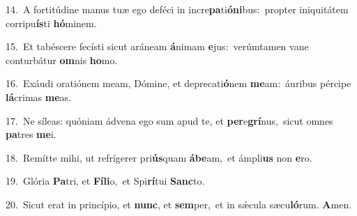 {\numbfont\textcolor{\numbcolor}{14.}}~A fortitúdine manus tuæ ego deféci in incre\-\textbf{pa}\-ti\-\textbf{ó}\-\textbf{ni}bus:~\star propter iniquitátem corripu\-\textbf{ís}\-ti \textbf{hó}\-minem.\par
{\numbfont\textcolor{\numbcolor}{15.}}~Et tabéscere fecísti sicut aráneam \textbf{á}\-nimam \textbf{e}\-jus:~\star verúmtamen vane conturbátur \textbf{om}\-nis \textbf{ho}\-mo.\par
{\numbfont\textcolor{\numbcolor}{16.}}~Exáudi oratiónem meam, Dómine, et deprecati\-\textbf{ó}\-nem \textbf{me}\-am:~\star áuribus pércipe \textbf{lá}\-crimas \textbf{me}\-as.\par
{\numbfont\textcolor{\numbcolor}{17.}}~Ne síleas: quóniam ádvena ego sum apud te, et \textbf{per}\-e\-\textbf{grí}\-nus,~\star sicut omnes \textbf{pa}\-tres \textbf{me}\-i.\par
{\numbfont\textcolor{\numbcolor}{18.}}~Remítte mihi, ut refrígerer pri\-\textbf{ús}\-quam \textbf{á}\-\textbf{be}am,~\star et ámpli\textbf{us} non \textbf{e}\-ro.\par
{\numbfont\textcolor{\numbcolor}{19.}}~Glória \textbf{Pa}\-tri, et \textbf{Fí}\-\textbf{li}o,~\star et Spi\-\textbf{rí}\-tui \textbf{Sanc}\-to.\par
{\numbfont\textcolor{\numbcolor}{20.}}~Sicut erat in princípio, et \textbf{nunc}\-, et \textbf{sem}\-per,~\star et in sǽcula sæcu\-\textbf{ló}\-rum. \textbf{A}\-men.\par

